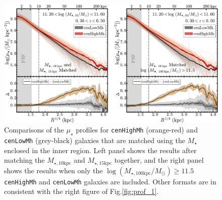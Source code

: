 \documentclass{emulateapj}
\def\rbcg{\texttt{cenHighMh}}
\def\nbcg{\texttt{cenLowMh}}
\def\mstar{{$M_{\star}$}}
\def\minn{{$M_{\star,10\mathrm{kpc}}$}}
\def\meff{{$M_{\star,15\mathrm{kpc}}$}}
\def\logmtot{{$\log (M_{\star,100\mathrm{kpc}}/M_{\odot})$}}
\def\mden{{$\mu_{\star}$}}
\begin{document}
\begin{CJK*}{UTF8}{gbsn}
  \begin{figure}[t!]
      \centering 
      \includegraphics[width=\textwidth]{fig/redbcg_prof_4}
      \caption{Comparisons of the \mden{} profiles for \rbcg{} (orange-red) and \nbcg{} 
          (grey-black) galaxies that are matched using the \mstar{} enclosed in the 
          inner region. 
          Left panel shows the results after matching the \minn{} and \meff{} together, 
          and the right panel shows the results when only the \logmtot{}$\ge 11.5$
          \rbcg{} and \nbcg{} galaxies are included.
          Other formats are in consistent with the right figure of Fig.\ref{fig:prof_1}.}
      \label{fig:prof_4} 
  \end{figure}
     
\clearpage




\end{CJK*}

\clearpage 

\label{lastpage}
\end{document}

